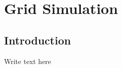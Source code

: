 \graphicspath{{chapt_dutch/}{intro/}{chapt2/}{chapt3/}{chapt4/}{chapt5/}}

\renewcommand\evenpagerightmark{{\scshape\small Chapter 3}}
\renewcommand\oddpageleftmark{{\scshape\small Grid Simulation}}

\renewcommand{\bibname}{References}

\hyphenation{}

\chapter[Grid Simulation]%
{Grid Simulation}
\label{ch3}

\section{Introduction} 

Write text here

\clearpage




\clearpage{\pagestyle{empty}\cleardoublepage}
